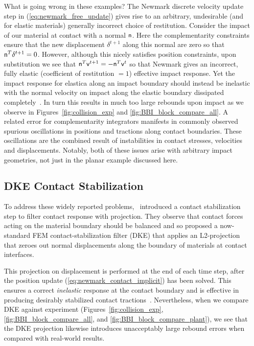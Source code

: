What is going wrong in these examples? The Newmark discrete velocity update step in (\ref{eq:newmark_free_update}) gives rise to an arbitrary, undesirable (and for elastic materials) generally incorrect choice of restitution. Consider the impact of our material at contact with a normal $\mbox{\textbf{{$\mathsf n$}}}$. Here the complementarity constraints ensure that the new displacement $\delta^{t+1}$ along this normal are zero so that $\mbox{\textbf{{$\mathsf n$}}}^T \delta^{t+1} = 0$. However, although this nicely satisfies position constraints, upon substitution we see that $\mbox{\textbf{{$\mathsf n$}}}^T \mbox{\textbf{{$\mathsf v$}}}^{t+1} =  -\mbox{\textbf{{$\mathsf n$}}}^T \mbox{\textbf{{$\mathsf v$}}}^t$ so that Newmark gives an incorrect, fully elastic (coefficient of restitution $= 1$) effective impact response. Yet the impact response for elastica along an impact boundary should instead be inelastic with the normal velocity on impact along the elastic boundary dissipated completely~\cite{Doyen:2011gka}. In turn this results in much too large rebounds upon impact as we observe in Figures~\ref{fig:collision_exp} and \ref{fig:BBI_block_compare_all}. A related error for complementarity integrators manifests in commonly observed spurious oscillations in positions and tractions along contact boundaries. These oscillations are the combined result of instabilities in contact stresses, velocities and displacements. Notably, both of these issues arise with arbitrary impact geometries, not just in the planar example discussed here.

\subsection{DKE Contact Stabilization} 
To address these widely reported problems,~\citet{Deuflhard:2008fu} introduced a contact stabilization step to filter contact response with projection. They observe that contact forces acting on the material boundary should be balanced and so proposed a now-standard FEM contact-stabilization filter (DKE) that applies an L2-projection that zeroes out normal displacements along the boundary of materials at contact interfaces.  

This projection on displacement is performed at the end of each time step, after the position update (\ref{eq:newmark_contact_implicit}) has been solved. This ensures a correct \emph{inelastic} response at the contact boundary and is effective in producing desirably stabilized contact tractions~\cite{Deuflhard:2008fu,Krause:2012im}. 
Nevertheless, when we compare DKE against experiment (Figures~\ref{fig:collision_exp}, \ref{fig:BBI_block_compare_all}, and \ref{fig:BBI_block_compare_plant}), we see that the DKE projection likewise introduces unacceptably large rebound errors when compared with real-world results.

